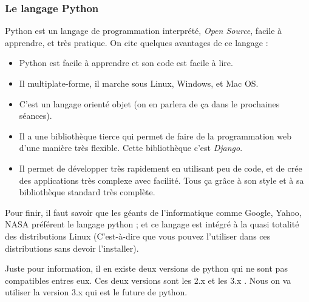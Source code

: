 \documentclass[12pt]{article}
\begin{document}
        \subsubsection{Le langage Python}
            Python est un langage de programmation interprété, \emph{Open Source}, facile à apprendre, 
            et très pratique. On cite quelques avantages de ce langage :
            \begin{itemize}
                \item Python est facile à apprendre et son code est facile à lire.
                \item Il multiplate-forme, il marche sous Linux, Windows, et Mac OS.
                \item C'est un langage orienté objet (on en parlera de ça dans le prochaines séances).
                \item Il a une bibliothèque tierce qui permet de faire de la programmation web d'une manière très flexible.
                    Cette bibliothèque c'est \emph{Django}.
                \item Il permet de développer très rapidement en utilisant peu de code, et de crée des applications 
                    très complexe avec facilité. Tous ça grâce à son style et à sa bibliothèque standard très complète.
            \end{itemize}

            Pour finir, il faut savoir que les géants de l'informatique comme Google, Yahoo, NASA préférent le langage
            python ; et ce langage est intégré à la quasi totalité des distributions Linux (C'est-à-dire que vous pouvez l'utiliser
            dans ces distributions sans devoir l'installer).

            Juste pour information, il en existe deux versions de python qui ne sont pas compatibles entres eux. Ces
            deux versions sont les 2.x et les 3.x . Nous on va utiliser la version 3.x qui est le future de python.
\end{document}
